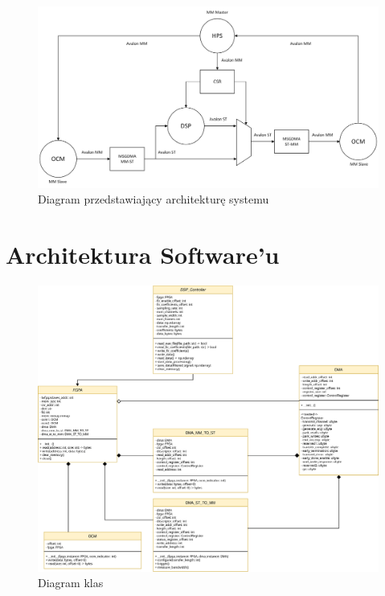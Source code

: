 \begin{figure}[!htb]
    \centerline{\includegraphics[scale=0.5]{hardwareSystemDiagram.png}}
    \caption{Diagram przedstawiający architekturę systemu}
    \label{fig:architektura}
\end{figure}

\newpage
\section{Architektura Software'u}
\label{sec:architektura-sw}

\begin{figure}[!htb]
    \includegraphics[scale=0.53]{classDiagram.eps}
    \caption{Diagram klas}
    \label{fig:diagram-klas}
\end{figure}




